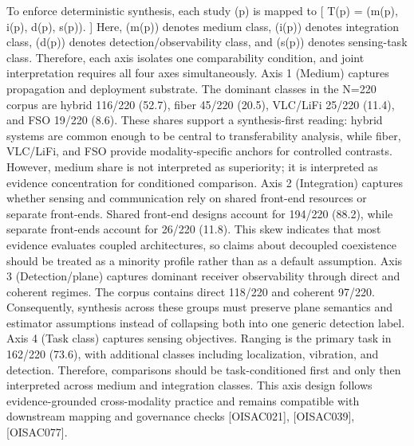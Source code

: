 {}To enforce deterministic synthesis, each study (p) is mapped to\markdownRendererSoftLineBreak
{}[\markdownRendererSoftLineBreak
{}T(p) = (m(p), i(p), d(p), s(p)).\markdownRendererSoftLineBreak
{}]\markdownRendererSoftLineBreak
{}Here, (m(p)) denotes medium class, (i(p)) denotes integration class, (d(p)) denotes detection/observability class, and (s(p)) denotes sensing-task class. Therefore, each axis isolates one comparability condition, and joint interpretation requires all four axes simultaneously.\markdownRendererParagraphSeparator
{}Axis 1 (Medium) captures propagation and deployment substrate. The dominant classes in the N=220 corpus are hybrid 116/220 (52.7\markdownRendererPercentSign{}), fiber 45/220 (20.5\markdownRendererPercentSign{}), VLC/LiFi 25/220 (11.4\markdownRendererPercentSign{}), and FSO 19/220 (8.6\markdownRendererPercentSign{}). These shares support a synthesis-first reading: hybrid systems are common enough to be central to transferability analysis, while fiber, VLC/LiFi, and FSO provide modality-specific anchors for controlled contrasts. However, medium share is not interpreted as superiority; it is interpreted as evidence concentration for conditioned comparison.\markdownRendererParagraphSeparator
{}Axis 2 (Integration) captures whether sensing and communication rely on shared front-end resources or separate front-ends. Shared front-end designs account for 194/220 (88.2\markdownRendererPercentSign{}), while separate front-ends account for 26/220 (11.8\markdownRendererPercentSign{}). This skew indicates that most evidence evaluates coupled architectures, so claims about decoupled coexistence should be treated as a minority profile rather than as a default assumption.\markdownRendererParagraphSeparator
{}Axis 3 (Detection/plane) captures dominant receiver observability through direct and coherent regimes. The corpus contains direct 118/220 and coherent 97/220. Consequently, synthesis across these groups must preserve plane semantics and estimator assumptions instead of collapsing both into one generic detection label.\markdownRendererParagraphSeparator
{}Axis 4 (Task class) captures sensing objectives. Ranging is the primary task in 162/220 (73.6\markdownRendererPercentSign{}), with additional classes including localization, vibration, and detection. Therefore, comparisons should be task-conditioned first and only then interpreted across medium and integration classes.\markdownRendererParagraphSeparator
{}This axis design follows evidence-grounded cross-modality practice and remains compatible with downstream mapping and governance checks [O\markdownRendererUnderscore{}ISAC\markdownRendererUnderscore{}021], [O\markdownRendererUnderscore{}ISAC\markdownRendererUnderscore{}039], [O\markdownRendererUnderscore{}ISAC\markdownRendererUnderscore{}077].\markdownRendererInterblockSeparator
